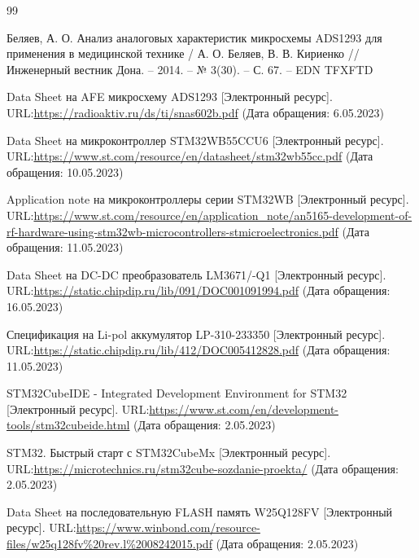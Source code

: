\newpage
\renewcommand\refname{\centering СПИСОК ИСПОЛЬЗОВАННЫХ ИСТОЧНИКОВ}
\begin {thebibliography} {99}

Беляев, А. О. Анализ аналоговых характеристик микросхемы ADS1293 для применения в медицинской технике / А. О. Беляев, В. В. Кириенко // Инженерный вестник Дона. – 2014. – № 3(30). – С. 67. – EDN TFXFTD

Data Sheet на AFE микросхему ADS1293  [Электронный ресурс]. URL:\href{https://radioaktiv.ru/ds/ti/snas602b.pdf}{https://radioaktiv.ru/ds/ti/snas602b.pdf} (Дата обращения: 6.05.2023)



Data Sheet на микроконтроллер STM32WB55CCU6  [Электронный ресурс]. URL:\href{https://www.st.com/resource/en/datasheet/stm32wb55cc.pdf}{https://www.st.com/resource/en/datasheet/stm32wb55cc.pdf} (Дата обращения: 10.05.2023)


Application note на микроконтроллеры серии STM32WB  [Электронный ресурс]. URL:\href{https://www.st.com/resource/en/application_note/an5165-development-of-rf-hardware-using-stm32wb-microcontrollers-stmicroelectronics.pdf}{https://www.st.com/resource/en/application\_note/an5165-development-of-rf-hardware-using-stm32wb-microcontrollers-stmicroelectronics.pdf} (Дата обращения: 11.05.2023)

Data Sheet на DC-DC преобразователь LM3671/-Q1  [Электронный ресурс]. URL:\href{https://static.chipdip.ru/lib/091/DOC001091994.pdf}{https://static.chipdip.ru/lib/091/DOC001091994.pdf} (Дата обращения: 16.05.2023)


Спецификация на Li-pol аккумулятор LP-310-233350  [Электронный ресурс]. URL:\href{https://static.chipdip.ru/lib/412/DOC005412828.pdf}{https://static.chipdip.ru/lib/412/DOC005412828.pdf} (Дата обращения: 11.05.2023)


STM32CubeIDE - Integrated Development Environment for STM32 [Электронный ресурс]. URL:\href{https://www.st.com/en/development-tools/stm32cubeide.html}{https://www.st.com/en/development-tools/stm32cubeide.html} (Дата обращения: 2.05.2023)


STM32. Быстрый старт с STM32CubeMx  [Электронный ресурс]. URL:\href{https://microtechnics.ru/stm32cube-sozdanie-proekta/}{https://microtechnics.ru/stm32cube-sozdanie-proekta/} (Дата обращения: 2.05.2023)


Data Sheet на последовательную FLASH память W25Q128FV [Электронный ресурс]. URL:\href{https://www.winbond.com/resource-files/w25q128fv\%20rev.l\%2008242015.pdf} {https://www.winbond.com/resource-files/w25q128fv\%20rev.l\%2008242015.pdf} (Дата обращения: 2.05.2023)




\end {thebibliography}




